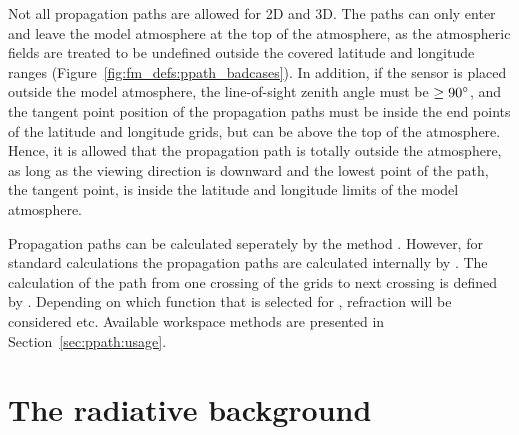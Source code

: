 Not all propagation paths are allowed for 2D and 3D. The paths can
only enter and leave the model atmosphere at the top of the
atmosphere, as the atmospheric fields are treated to be undefined
outside the covered latitude and longitude ranges
(Figure~\ref{fig:fm_defs:ppath_badcases}). In addition, if the sensor
is placed outside the model atmosphere, the line-of-sight zenith angle
must be $\geq90^\circ$, and the tangent point position of the
propagation paths must be inside the end points of the latitude and
longitude grids, but can be above the top of the atmosphere. Hence, it
is allowed that the propagation path is totally outside the
atmosphere, as long as the viewing direction is downward and the
lowest point of the path, the tangent point, is inside the latitude
and longitude limits of the model atmosphere.

Propagation paths can be calculated seperately by the method
. However, for standard calculations the propagation paths
are calculated internally by . The calculation of the path
from one crossing of the grids to next crossing is defined by
. Depending on which function that is selected
for , refraction will be considered etc.
Available workspace methods are presented in Section~\ref{sec:ppath:usage}.




\section{The radiative background}
\label{sec:fm_defs:rad_bkgr}

